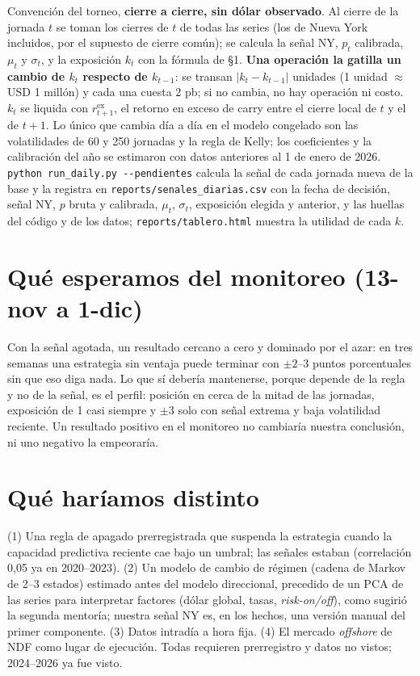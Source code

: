 \documentclass[11pt,a4paper]{article}
\newcommand{\rex}{r^{\text{ex}}}
\begin{document}
Convención del torneo, \textbf{cierre a cierre, sin dólar observado}. Al cierre de la jornada $t$ se toman los cierres de $t$ de todas las series (los de Nueva York incluidos, por el supuesto de cierre común); se calcula la señal NY, $p_t$ calibrada, $\mu_t$ y $\sigma_t$, y la exposición $k_t$ con la fórmula de \S1. \textbf{Una operación la gatilla un cambio de $k_t$ respecto de $k_{t-1}$}: se transan $|k_t-k_{t-1}|$ unidades (1 unidad $\approx$ USD 1 millón) y cada una cuesta 2 pb; si no cambia, no hay operación ni costo. $k_t$ se liquida con $\rex_{t+1}$, el retorno en exceso de carry entre el cierre local de $t$ y el de $t+1$. Lo único que cambia día a día en el modelo congelado son las volatilidades de 60 y 250 jornadas y la regla de Kelly; los coeficientes y la calibración del año se estimaron con datos anteriores al 1 de enero de 2026. \texttt{python run\_daily.py -{}-pendientes} calcula la señal de cada jornada nueva de la base y la registra en \texttt{reports/senales\_diarias.csv} con la fecha de decisión, señal NY, $p$ bruta y calibrada, $\mu_t$, $\sigma_t$, exposición elegida y anterior, y las huellas del código y de los datos; \texttt{reports/tablero.html} muestra la utilidad de cada $k$.

\section{Qué esperamos del monitoreo (13-nov a 1-dic)}

Con la señal agotada, un resultado cercano a cero y dominado por el azar: en tres semanas una estrategia sin ventaja puede terminar con $\pm2$--3 puntos porcentuales sin que eso diga nada. Lo que sí debería mantenerse, porque depende de la regla y no de la señal, es el perfil: posición en cerca de la mitad de las jornadas, exposición de 1 casi siempre y $\pm3$ solo con señal extrema y baja volatilidad reciente. Un resultado positivo en el monitoreo no cambiaría nuestra conclusión, ni uno negativo la empeoraría.

\section{Qué haríamos distinto}

(1) Una regla de apagado prerregistrada que suspenda la estrategia cuando la capacidad predictiva reciente cae bajo un umbral; las señales estaban (correlación 0,05 ya en 2020--2023). (2) Un modelo de cambio de régimen (cadena de Markov de 2--3 estados) estimado antes del modelo direccional, precedido de un PCA de las series para interpretar factores (dólar global, tasas, \emph{risk-on/off}), como sugirió la segunda mentoría; nuestra señal NY es, en los hechos, una versión manual del primer componente. (3) Datos intradía a hora fija. (4) El mercado \emph{offshore} de NDF como lugar de ejecución. Todas requieren prerregistro y datos no vistos; 2024--2026 ya fue visto.
\end{document}
